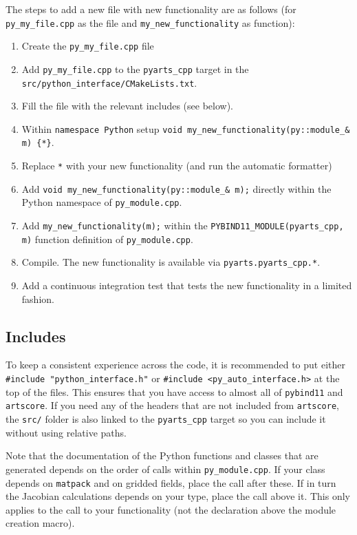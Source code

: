 The steps to add a new file with new functionality are as follows (for \verb|py_my_file.cpp| as the file and \verb|my_new_functionality| as function):
\begin{enumerate}
\item Create the \verb|py_my_file.cpp| file
\item Add \verb|py_my_file.cpp| to the \verb|pyarts_cpp| target in the \verb|src/python_interface/CMakeLists.txt|.
\item Fill the file with the relevant includes (see below).
\item Within \verb|namespace Python| setup \verb|void my_new_functionality(py::module_& m) {*}|.
\item Replace \verb|*| with your new functionality (and run the automatic formatter)
\item Add \verb|void my_new_functionality(py::module_& m);| directly within the Python namespace of  \verb|py_module.cpp|.
\item Add \verb|my_new_functionality(m);| within the \verb|PYBIND11_MODULE(pyarts_cpp, m)| function definition of  \verb|py_module.cpp|.
\item Compile.  The new functionality is available via \verb|pyarts.pyarts_cpp.*|.
\item Add a continuous integration test that tests the new functionality in a limited fashion.
\end{enumerate}

\subsection{Includes}
To keep a consistent experience across the code, it is recommended to put either \verb|#include "python_interface.h"| or \verb|#include <py_auto_interface.h>|
at the top of the files.  This ensures that you have access to almost all of \verb|pybind11| and \verb|artscore|.  If you need any of the headers that are
not included from \verb|artscore|, the \verb|src/| folder is also linked to the \verb|pyarts_cpp| target so you can include it without using relative paths.

Note that the documentation of the Python functions and classes that are generated depends on the order of calls within \verb|py_module.cpp|.  If your
class depends on  \verb|matpack| and on gridded fields, place the call after these.  If in turn the Jacobian calculations depends on your type,
place the call above it.  This only applies to the call to your functionality (not the declaration above the module creation macro).

